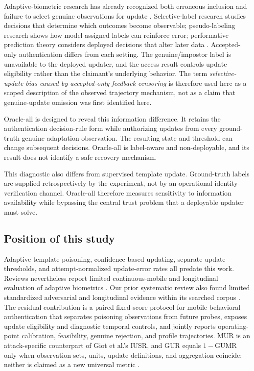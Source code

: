 \documentclass[technologies,article,submit,moreauthors]{Definitions/mdpi}
\begin{document}
Adaptive-biometric research has already recognized both erroneous inclusion and failure to select genuine observations for update \cite{Giot2012HybridTemplateUpdate}. Selective-label research studies decisions that determine which outcomes become observable; pseudo-labeling research shows how model-assigned labels can reinforce error; performative-prediction theory considers deployed decisions that alter later data \cite{Lakkaraju2017SelectiveLabels,Arazo2020ConfirmationBias,Perdomo2020PerformativePrediction}. Accepted-only authentication differs from each setting. The genuine/impostor label is unavailable to the deployed updater, and the access result controls update eligibility rather than the claimant's underlying behavior. The term \emph{selective-update bias caused by accepted-only feedback censoring} is therefore used here as a scoped description of the observed trajectory mechanism, not as a claim that genuine-update omission was first identified here.

Oracle-all is designed to reveal this information difference. It retains the authentication decision-rule form while authorizing updates from every ground-truth genuine adaptation observation. The resulting state and threshold can change subsequent decisions. Oracle-all is label-aware and non-deployable, and its result does not identify a safe recovery mechanism.

This diagnostic also differs from supervised template update. Ground-truth labels are supplied retrospectively by the experiment, not by an operational identity-verification channel. Oracle-all therefore measures sensitivity to information availability while bypassing the central trust problem that a deployable updater must solve.

\subsection{Position of this study}\label{sec:position-of-this-study}

Adaptive template poisoning, confidence-based updating, separate update thresholds, and attempt-normalized update-error rates all predate this work. Reviews nevertheless report limited continuous-mobile and longitudinal evaluation of adaptive biometrics \cite{Ryu2023AdaptiveBiometrics}. Our prior systematic review also found limited standardized adversarial and longitudinal evidence within its searched corpus \cite{Gali2026SystematicReview}. The residual contribution is a paired fixed-score protocol for mobile behavioral authentication that separates poisoning observations from future probes, exposes update eligibility and diagnostic temporal controls, and jointly reports operating-point calibration, feasibility, genuine rejection, and profile trajectories. MUR is an attack-specific counterpart of Giot et al.'s IUSR, and GUR equals \(1-\mathrm{GUMR}\) only when observation sets, units, update definitions, and aggregation coincide; neither is claimed as a new universal metric \cite{Giot2012HybridTemplateUpdate}.
\end{document}

